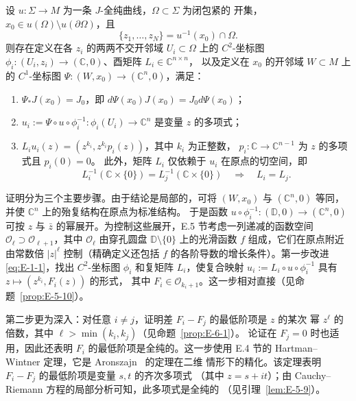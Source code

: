 \begin{theorem}\label{thm:E-1-1}
设 $u:\Sigma\to M$ 为一条 $J$-全纯曲线，$\Omega\subset\Sigma$ 为闭包紧的
开集，$x_0\in u(\Omega)\setminus u(\partial\Omega)$，且
\[
  \{z_1,\ldots,z_N\}=u^{-1}(x_0)\cap\Omega.
\]
则存在定义在各 $z_i$ 的两两不交开邻域 $U_i\subset\Omega$ 上的 $C^2$-坐标图
$\phi_i:(U_i,z_i)\to(\mathbb C,0)$、酉矩阵 $L_i\in\mathbb C^{n\times n}$，
以及定义在 $x_0$ 的开邻域 $W\subset M$ 上的 $C^1$-坐标图
$\Psi:(W,x_0)\to(\mathbb C^n,0)$，满足：
\begin{enumerate}
  \item[(i)] $\Psi_*J(x_0)=J_0$，即
    $d\Psi(x_0)J(x_0)=J_0d\Psi(x_0)$；
  \item[(ii)] $u_i:=\Psi\circ u\circ\phi_i^{-1}:\phi_i(U_i)\to\mathbb C^n$
    是变量 $z$ 的多项式；
  \item[(iii)] $L_i u_i(z)=(z^{k_i},z^{k_i}p_i(z))$，其中 $k_i$ 为正整数，
    $p_i:\mathbb C\to\mathbb C^{n-1}$ 为 $z$ 的多项式且 $p_i(0)=0$。
    此外，矩阵 $L_i$ 仅依赖于 $u_i$ 在原点的切空间，即
    \[
      L_i^{-1}(\mathbb C\times\{0\})
      =L_j^{-1}(\mathbb C\times\{0\})\quad\Longrightarrow\quad L_i=L_j.
    \]
\end{enumerate}
\end{theorem}

证明分为三个主要步骤。由于结论是局部的，可将 $(W,x_0)$ 与
$(\mathbb C^n,0)$ 等同，并使 $\mathbb C^n$ 上的殆复结构在原点为标准结构。
于是函数 $u\circ\phi_i^{-1}:(\mathbb D,0)\to(\mathbb C^n,0)$ 可按 $z$ 与
$\bar z$ 的幂展开。为控制这些展开，E.5 节考虑一列递减的函数空间
$\mathcal O_\ell\supset\mathcal O_{\ell+1}$，其中 $\mathcal O_\ell$ 由穿孔圆盘
$\mathbb D\setminus\{0\}$ 上的光滑函数 $f$ 组成，它们在原点附近由常数倍
$|z|^\ell$ 控制（精确定义还包括 $f$ 的各阶导数的增长条件）。第一步改进
\eqref{eq:E-1-1}，找出 $C^2$-坐标图 $\phi_i$ 和复矩阵 $L_i$，使复合映射
$u_i:=L_i\circ u\circ\phi_i^{-1}$ 具有 $z\mapsto(z^{k_i},F_i(z))$ 的形式，
其中 $F_i\in\mathcal O_{k_i+1}$。这一步相对直接（见命题~\ref{prop:E-5-10}）。

第二步更为深入：对任意 $i\ne j$，证明差 $F_i-F_j$ 的最低阶项是 $z$ 的某次
幂 $z^\ell$ 的倍数，其中 $\ell>\min(k_i,k_j)$（见命题~\ref{prop:E-6-1}）。
论证在 $F_j=0$ 时也适用，因此还表明 $F_i$ 的最低阶项是全纯的。这一步使用
E.4 节的 Hartman--Wintner 定理，它是 Aronszajn~ 的定理在二维
情形下的精化。该定理表明 $F_i-F_j$ 的最低阶项是变量 $s,t$ 的齐次多项式
（其中 $z=s+it$）；由 Cauchy--Riemann 方程的局部分析可知，此多项式是全纯的
（见引理~\ref{lem:E-5-9}）。

